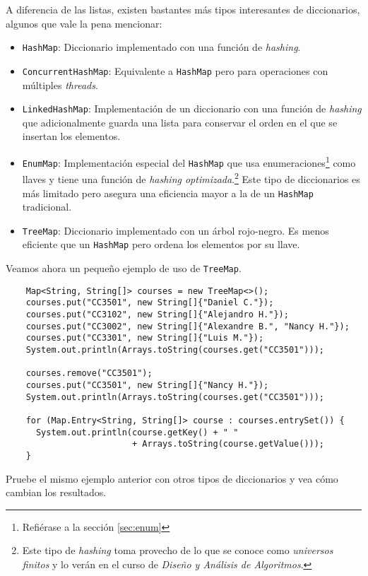   A diferencia de las listas, existen bastantes más tipos interesantes de diccionarios, algunos que
  vale la pena mencionar:
  \begin{itemize}
    \item \texttt{HashMap}: Diccionario implementado con una función de \textit{hashing}.
    \item \texttt{ConcurrentHashMap}: Equivalente a \texttt{HashMap} pero para operaciones con 
      múltiples \textit{threads}.
    \item \texttt{LinkedHashMap}: Implementación de un diccionario con una función de 
      \textit{hashing} que adicionalmente guarda una lista para conservar el orden en el que se 
      insertan los elementos.
    \item \texttt{EnumMap}: Implementación especial del \texttt{HashMap} que usa 
      enumeraciones\footnote{Refiérase a la sección \ref{sec:enum}} como llaves y tiene una función 
      de \textit{hashing optimizada}.\footnote{Este tipo de \textit{hashing} toma provecho de lo que 
      se conoce como \textit{universos finitos} y lo verán en el curso de \textit{Diseño y Análisis
      de Algoritmos}.}
      Este tipo de diccionarios es más limitado pero asegura una eficiencia mayor a la de un 
      \texttt{HashMap} tradicional.
    \item \texttt{TreeMap}: Diccionario implementado con un árbol rojo-negro.
      Es menos eficiente que un \texttt{HashMap} pero ordena los elementos por su llave.
  \end{itemize}

  Veamos ahora un pequeño ejemplo de uso de \texttt{TreeMap}.

  \begin{verbatim}
    Map<String, String[]> courses = new TreeMap<>();
    courses.put("CC3501", new String[]{"Daniel C."});
    courses.put("CC3102", new String[]{"Alejandro H."});
    courses.put("CC3002", new String[]{"Alexandre B.", "Nancy H."});
    courses.put("CC3301", new String[]{"Luis M."});
    System.out.println(Arrays.toString(courses.get("CC3501")));

    courses.remove("CC3501");
    courses.put("CC3501", new String[]{"Nancy H."});
    System.out.println(Arrays.toString(courses.get("CC3501")));

    for (Map.Entry<String, String[]> course : courses.entrySet()) {
      System.out.println(course.getKey() + " "
                         + Arrays.toString(course.getValue()));
    }
  \end{verbatim}

  \begin{exercise}
    Pruebe el mismo ejemplo anterior con otros tipos de diccionarios y vea cómo cambian los 
    resultados.
  \end{exercise}